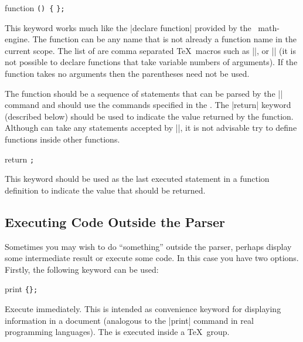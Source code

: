 \begin{math-keyword}{{function} \texttt{(}\texttt{) \{}  \texttt{\};}}

	This keyword works much like the |declare function| provided by the
	\pgfname\ math-engine.
	The function  can be any name that is not already a
	function name in the current scope. The list of  are 
	comma separated \TeX\ macros such as |\x|, or |\y| (it is not
	possible to declare functions that take variable numbers of arguments). 
	If the function
	takes no arguments then the parentheses need not be used.
	
	The function  should be a sequence of statements
	that can be parsed by the |\tikzmath| command and 
	should use the commands specified in the .	
	The |return| keyword (described below) should be used to indicate
	the value returned by the function.
	Although  can take any statements accepted by
	|\tikzmath|, it is not advisable try to define functions inside other 
	functions.
	
\begin{codeexample}[]
\end{codeexample}
	
\end{math-keyword}

\begin{math-keyword}{{return} \texttt{;}}
	
	This keyword should be used as the last executed statement 
	in a function definition to indicate the value that should be 
	returned.
	
\end{math-keyword}


\subsection{Executing Code Outside the Parser}
	
	Sometimes you may wish to do ``something'' outside the parser,
	perhaps display some intermediate result or execute some code.
	In this case
	you have two options. Firstly, the following keyword can be used:
		
\begin{math-keyword}{{print} \texttt{\{}\texttt{\};}}
	
	Execute  immediately. This is intended as convenience 
	keyword for displaying information in a document (analogous to
	the |print| command in real programming languages).
	The  is executed inside a \TeX\ group.
	
\begin{codeexample}[]
\end{codeexample}

\end{math-keyword}
	
